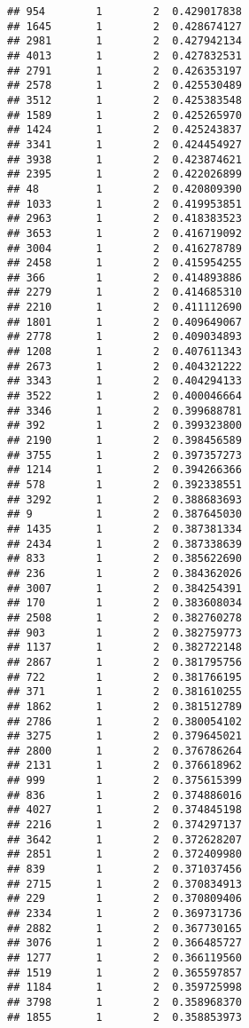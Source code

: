 \documentclass[
]{article}
\begin{document}
\begin{verbatim}
## 954        1        2  0.429017838
## 1645       1        2  0.428674127
## 2981       1        2  0.427942134
## 4013       1        2  0.427832531
## 2791       1        2  0.426353197
## 2578       1        2  0.425530489
## 3512       1        2  0.425383548
## 1589       1        2  0.425265970
## 1424       1        2  0.425243837
## 3341       1        2  0.424454927
## 3938       1        2  0.423874621
## 2395       1        2  0.422026899
## 48         1        2  0.420809390
## 1033       1        2  0.419953851
## 2963       1        2  0.418383523
## 3653       1        2  0.416719092
## 3004       1        2  0.416278789
## 2458       1        2  0.415954255
## 366        1        2  0.414893886
## 2279       1        2  0.414685310
## 2210       1        2  0.411112690
## 1801       1        2  0.409649067
## 2778       1        2  0.409034893
## 1208       1        2  0.407611343
## 2673       1        2  0.404321222
## 3343       1        2  0.404294133
## 3522       1        2  0.400046664
## 3346       1        2  0.399688781
## 392        1        2  0.399323800
## 2190       1        2  0.398456589
## 3755       1        2  0.397357273
## 1214       1        2  0.394266366
## 578        1        2  0.392338551
## 3292       1        2  0.388683693
## 9          1        2  0.387645030
## 1435       1        2  0.387381334
## 2434       1        2  0.387338639
## 833        1        2  0.385622690
## 236        1        2  0.384362026
## 3007       1        2  0.384254391
## 170        1        2  0.383608034
## 2508       1        2  0.382760278
## 903        1        2  0.382759773
## 1137       1        2  0.382722148
## 2867       1        2  0.381795756
## 722        1        2  0.381766195
## 371        1        2  0.381610255
## 1862       1        2  0.381512789
## 2786       1        2  0.380054102
## 3275       1        2  0.379645021
## 2800       1        2  0.376786264
## 2131       1        2  0.376618962
## 999        1        2  0.375615399
## 836        1        2  0.374886016
## 4027       1        2  0.374845198
## 2216       1        2  0.374297137
## 3642       1        2  0.372628207
## 2851       1        2  0.372409980
## 839        1        2  0.371037456
## 2715       1        2  0.370834913
## 229        1        2  0.370809406
## 2334       1        2  0.369731736
## 2882       1        2  0.367730165
## 3076       1        2  0.366485727
## 1277       1        2  0.366119560
## 1519       1        2  0.365597857
## 1184       1        2  0.359725998
## 3798       1        2  0.358968370
## 1855       1        2  0.358853973

\end{verbatim}
\end{document}
